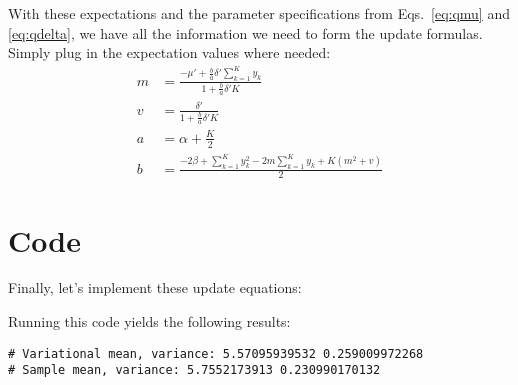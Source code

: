 \documentclass[12pt]{article}
\begin{document}
With these expectations and the parameter specifications from Eqs.~\ref{eq:qmu}
and \ref{eq:qdelta}, we have all the information we need to form the update
formulas.  Simply plug in the expectation values where needed:
\begin{align}
    m &= \frac{-\mu' + \frac{b}{a} \delta' \sum_{k=1}^{K}
    y_{k}}{1 + \frac{b}{a}\delta'K}
    \\
    v &= \frac{\delta'}{1 + \frac{b}{a}\delta'K}
    \\
    a &= \alpha + \frac{K}{2}
    \\
    b &= \frac{-2\beta + \sum_{k=1}^{K} y_{k}^{2} - 2m
    \sum_{k=1}^{K} y_{k} + K(m^2 + v)}{2}
\end{align}

\section{Code}

Finally, let's implement these update equations:


Running this code yields the following results:
\begin{verbatim}
# Variational mean, variance: 5.57095939532 0.259009972268
# Sample mean, variance: 5.7552173913 0.230990170132
\end{verbatim}
\end{document}
